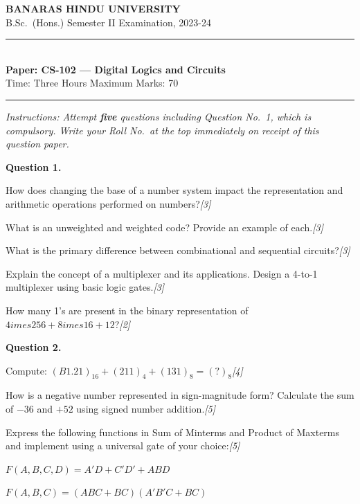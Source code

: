 \documentclass[11pt,a4paper]{article}
\newcommand{\pts}[1]{\hfill   \textit{[#1]}}
\begin{document}
\begin{center}
  {\large\bfseries BANARAS HINDU UNIVERSITY}\\[2pt]
  {\normalsize B.Sc.\ (Hons.) Semester II Examination, 2023-24}\\[6pt]
  \rule{0.8\linewidth}{0.5pt}\\[6pt]
  {\large\bfseries Paper: CS-102 --- Digital Logics and Circuits}\\[4pt]
  {\normalsize Time: Three Hours \hfill Maximum Marks: 70}
\end{center}
\rule{\linewidth}{0.4pt}
\smallskip



\noindent   \textit{Instructions: Attempt   \textbf{five} questions including Question No.~1, which is compulsory. Write your Roll No.\ at the top immediately on receipt of this question paper.}
\bigskip




\noindent   \textbf{Question 1.}

\begin{parts}
  \item How does changing the base of a number system impact the representation and arithmetic operations performed on numbers?\pts{3}
  \item What is an unweighted and weighted code? Provide an example of each.\pts{3}
  \item What is the primary difference between combinational and sequential circuits?\pts{3}
  \item Explain the concept of a multiplexer and its applications. Design a 4-to-1 multiplexer using basic logic gates.\pts{3}
  \item How many 1's are present in the binary representation of $4 imes256 + 8 imes16 + 12$?\pts{2}
\end{parts}

\bigskip



\noindent   \textbf{Question 2.}

\begin{parts}
  \item Compute: $(B1.21)_{16} + (211)_{4} + (131)_{8} = (?)_{8}$\pts{4}
  \item How is a negative number represented in sign-magnitude form? Calculate the sum of $-36$ and $+52$ using signed number addition.\pts{5}
  \item Express the following functions in Sum of Minterms and Product of Maxterms and implement using a universal gate of your choice:\pts{5}
    
\begin{parts}
      \item $F(A,B,C,D) = A'D + C'D' + ABD$
      \item $F(A,B,C) = (ABC + BC)(A'B'C + BC)$
    \end{parts}
\end{parts}
\end{document}
